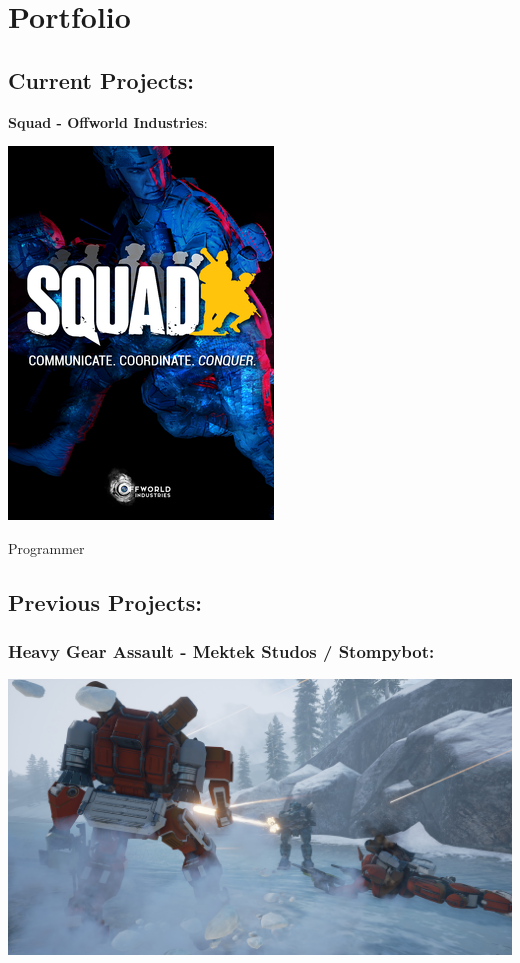 \documentclass[]{book}
\begin{document}
\chapter{Portfolio}\label{portfolio}

\section{Current Projects:}\label{current-projects}

\textbf{Squad - Offworld Industries}:

\includegraphics{Image/Squad_(videogame)_2016_frontcover.png}

Programmer

\section{Previous Projects:}\label{previous-projects}

\subsection{Heavy Gear Assault - Mektek Studos /
Stompybot:}\label{heavy-gear-assault---mektek-studos-stompybot}

\includegraphics{Image/HeavyGearAssaultPromoImage.jpg}
\end{document}
